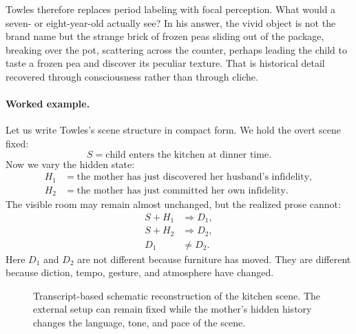 Towles therefore replaces period labeling with focal perception. What would a seven- or eight-year-old actually see? In his answer, the vivid object is not the brand name but the strange brick of frozen peas sliding out of the package, breaking over the pot, scattering across the counter, perhaps leading the child to taste a frozen pea and discover its peculiar texture. That is historical detail recovered through consciousness rather than through cliche.

\paragraph{Worked example.}

Let us write Towles's scene structure in compact form. We hold the overt scene fixed:
\begin{equation}
S = \text{child enters the kitchen at dinner time}.
\end{equation}
Now we vary the hidden state:
\begin{align}
H_1 &= \text{the mother has just discovered her husband's infidelity}, \\
H_2 &= \text{the mother has just committed her own infidelity}.
\end{align}
The visible room may remain almost unchanged, but the realized prose cannot:
\begin{align}
S + H_1 &\Rightarrow D_1, \\
S + H_2 &\Rightarrow D_2, \\
D_1 &\neq D_2.
\end{align}
Here \(D_1\) and \(D_2\) are not different because furniture has moved. They are different because diction, tempo, gesture, and atmosphere have changed.

\begin{figure}[h]
\centering
{}
\caption{Transcript-based schematic reconstruction of the kitchen scene. The external setup can remain fixed while the mother's hidden history changes the language, tone, and pace of the scene.}
\end{figure}


